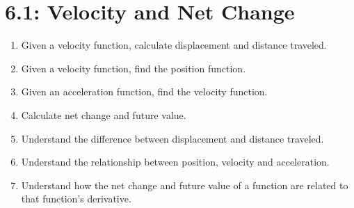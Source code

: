 \documentclass[11pt]{article}
\begin{document}
\section*{6.1: Velocity and Net Change}
\begin{enumerate}
	\item Given a velocity function, calculate displacement and distance traveled.
	\item Given a velocity function, find the position function.
	\item Given an acceleration function, find the velocity function.
	\item Calculate net change and future value.
	\item Understand the difference between displacement and distance traveled.
	\item Understand the relationship between position, velocity and acceleration.
	\item Understand how the net change and future value of a function are related to that function's derivative.
\end{enumerate}
\end{document}
